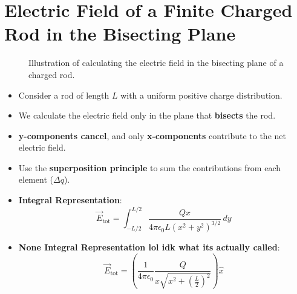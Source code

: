 \documentclass{article}
\begin{document}
\section*{Electric Field of a Finite Charged Rod in the Bisecting Plane}

\begin{figure}[h!]
    \centering
    \caption{Illustration of calculating the electric field in the bisecting plane of a charged rod.}
    \label{fig:bisecting_plane}
\end{figure}

\begin{itemize}
    \item Consider a rod of length \(L\) with a uniform positive charge distribution.
    \item We calculate the electric field only in the plane that \textbf{bisects} the rod.
    \item \textbf{y-components cancel}, and only \textbf{x-components} contribute to the net electric field.
    \item Use the \textbf{superposition principle} to sum the contributions from each element (\(\Delta q\)).
    \item \textbf{Integral Representation}:
    \[
    \vec{E}_{\text{tot}} = \int_{-L/2}^{L/2} \frac{Qx}{4 \pi \epsilon_0 L (x^2 + y^2)^{3/2}} \, dy
    \]
    \item \textbf{None Integral Representation lol idk what its actually called}:
    \[
    \vec{E}_{\text{tot}} = (\frac{1}{4 \pi \epsilon_0}\frac{Q}{x\sqrt {x^2 +(\frac{L}{2})^2}})\hat{x}
    \]
\end{itemize}
\end{document}
